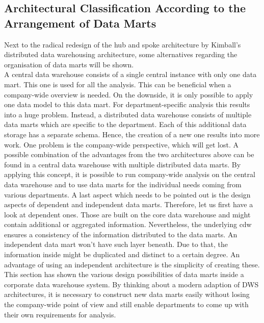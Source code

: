 \subsection{Architectural Classification According to the Arrangement of Data Marts}
Next to the radical redesign of the hub and spoke architecture by Kimball's distributed data warehousing architecture, some alternatives regarding the organisation of data marts will be shown.\newline
\\
A central data warehouse consists of a single central instance with only one data mart. This one is used for all the analysis. This can be beneficial when a company-wide overview is needed. On the downside, it is only possible to apply one data model to this data mart. For department-specific analysis this results into a huge problem. \newline
Instead, a distributed data warehouse consists of multiple data marts which are specific to the department. Each of this additional data storage has a separate schema. Hence, the creation of a new one results into more work. One problem is the company-wide perspective, which will get lost. \newline
A possible combination of the advantages from the two architectures above can be found in a central data warehouse with multiple distributed data marts. By applying this concept, it is possible to run company-wide analysis on the central data warehouse and to use data marts for the individual needs coming from various departments.
\newline
A last aspect which needs to be pointed out is the design aspects of dependent and independent data marts. Therefore, let us first have a look at dependent ones. Those are built on the core data warehouse and might contain additional or aggregated information. Nevertheless, the underlying \acrshort{cdw} ensures a consistency of the information distributed to the data marts. An independent data mart won't have such layer beneath. Due to that, the information inside might be duplicated and distinct to a certain degree. An advantage of using an independent architecture is the simplicity of creating these. \cite{scriptRasch} \newline
\\
This section has shown the various design possibilities of data marts inside a corporate data warehouse system. By thinking about a modern adaption of DWS architectures, it is necessary to construct new data marts easily without losing the company-wide point of view and still enable departments to come up with their own requirements for analysis. 

